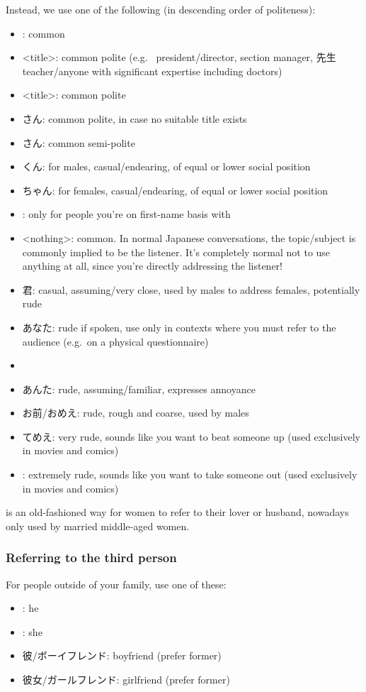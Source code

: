 \documentclass[../nihongo-gakushuu-kyouzai.tex]{subfiles}
\begin{document}
Instead, we use one of the following (in descending order of politeness):
\begin{itemize}
    \item <last name>: common
    \item <title>: common polite (e.g.\  president/director,  section manager, 先生 teacher/anyone with significant expertise including doctors)
    \item <last name><title>: common polite
    \item <last name>さん: common polite, in case no suitable title exists
    \item <first name>さん: common semi-polite
    \item <last name>くん: for males, casual/endearing, of equal or lower social position
    \item <last name>ちゃん: for females, casual/endearing, of equal or lower social position
    \item <first name>[\{くん, ちゃん\}]: only for people you're on first-name basis with
    \item <nothing>: common. In normal Japanese conversations, the topic/subject is commonly implied to be the listener. It's completely normal not to use anything at all, since you're directly addressing the listener!
    \item 君: casual, assuming/very close, used by males to address females, potentially rude
    \item あなた: rude if spoken, use only in contexts where you must refer to the audience (e.g.\ on a physical questionnaire)
    \item {}
    \item あんた: rude, assuming/familiar, expresses annoyance
    \item お前/おめえ: rude, rough and coarse, used by males
    \item てめえ: very rude, sounds like you want to beat someone up (used exclusively in movies and comics)
    \item {}: extremely rude, sounds like you want to take someone out (used exclusively in movies and comics)
\end{itemize}

 is an old-fashioned way for women to refer to their lover or husband, nowadays only used by married middle-aged women.

\subsubsection{Referring to the third person}
For people outside of your family, use one of these:
\begin{itemize}
    \item {}: he
    \item {}: she
    \item 彼/ボーイフレンド: boyfriend (prefer former)
    \item 彼女/ガールフレンド: girlfriend (prefer former)
\end{itemize}
\end{document}
